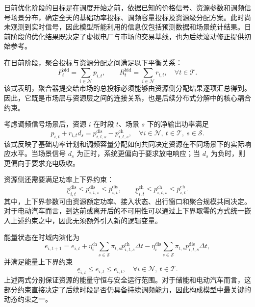 日前优化阶段的目标是在调度开始之前，依据已知的价格信号、资源参数和调频信号场景分布，确定全天的基础功率投标、调频容量投标及资源级分配方案。此时尚未观测到实时信号，因此模型所能利用的信息仅包括预测数据和场景统计结果。日前阶段的优化结果既决定了虚拟电厂与市场的交易基线，也为后续滚动修正提供初始参考。

在日前阶段，聚合投标与资源分配之间满足以下平衡关系：
\begin{equation}
P_t^{\mathrm{bid}} = \sum_{i \in \mathcal{N}} p_{i,t}, \qquad
R_t^{\mathrm{bid}} = \sum_{i \in \mathcal{N}} r_{i,t}, \quad \forall t \in \mathcal{T}.
\end{equation}
该式表明，聚合器提交给市场的总投标必须能够由资源侧分配结果逐项汇总得到。因此，它既是市场层与资源层之间的连接关系，也是后续分布式分解中的核心耦合约束。

考虑调频信号场景后，资源 $i$ 在时段 $t$、场景 $s$ 下的净输出功率满足
\begin{equation}
p_{i,t} + r_{i,t} d_s = p_{i,t,s}^{\mathrm{dis}} - p_{i,t,s}^{\mathrm{ch}}, \quad \forall i \in \mathcal{N},\ t \in \mathcal{T},\ s \in \mathcal{S}.
\end{equation}
该式反映了基础功率计划和调频容量分配如何共同决定资源在不同场景下的实际响应水平。当场景信号 $d_s$ 为正时，系统更偏向于要求放电响应；当 $d_s$ 为负时，则更偏向于要求充电吸收。

资源侧还需要满足功率上下界约束：
\begin{equation}
\underline p_{i,t}^{\mathrm{dis}} \le p_{i,t,s}^{\mathrm{dis}} \le \overline p_{i,t}^{\mathrm{dis}},
\qquad
\underline p_{i,t}^{\mathrm{ch}} \le p_{i,t,s}^{\mathrm{ch}} \le \overline p_{i,t}^{\mathrm{ch}}.
\end{equation}
其中，上下界参数可由资源额定功率、接入状态、出行窗口和聚合规模共同决定。对于电动汽车而言，到达前或离开后的不可用性可以通过上下界取零的方式统一嵌入上述约束之中，因此无须额外引入新的逻辑变量。

能量状态在时域内演化为
\begin{equation}
e_{i,t+1} = e_{i,t}
+ \eta_i^{\mathrm{ch}} \sum_{s \in \mathcal{S}} \pi_{t,s} p_{i,t,s}^{\mathrm{ch}} \Delta t
- \eta_i^{\mathrm{dis}} \sum_{s \in \mathcal{S}} \pi_{t,s} p_{i,t,s}^{\mathrm{dis}} \Delta t,
\end{equation}
并满足能量上下界约束
\begin{equation}
\underline e_{i,t} \le e_{i,t} \le \overline e_{i,t}, \quad \forall i \in \mathcal{N},\ t \in \mathcal{T}.
\end{equation}
上述两式分别保证资源的能量守恒与安全运行范围。对于储能和电动汽车而言，这部分约束直接决定了后续时段是否仍具备持续调频能力，因此构成模型中最关键的动态约束之一。

